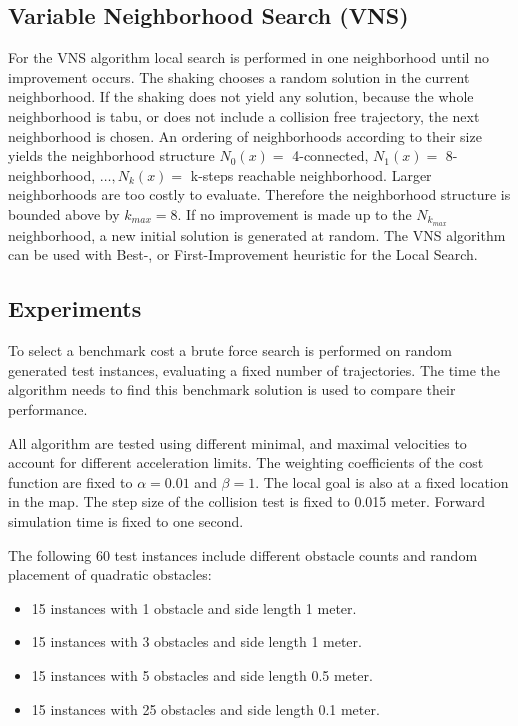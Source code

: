 \subsection{Variable Neighborhood Search (VNS)}
For the VNS algorithm local search is performed in one neighborhood until no improvement occurs. 
The shaking chooses a random solution in the current neighborhood. 
If the shaking does not yield any solution, because the whole neighborhood is tabu, or does not include a collision free trajectory, the next neighborhood is chosen. 
An ordering of neighborhoods according to their size yields the neighborhood structure $N_0(x)=$ 4-connected, $N_1(x)=$ 8-neighborhood, $\dots, N_k(x)=$ k-steps reachable neighborhood.
Larger neighborhoods are too costly to evaluate. 
Therefore the neighborhood structure is bounded above by $k_{max}=8$. 
If no improvement is made up to the $N_{k_{max}}$ neighborhood, a new initial solution is generated at random. 
The VNS algorithm can be used with Best-, or First-Improvement heuristic for the Local Search.

\subsection{Experiments}
To select a benchmark cost a brute force search is performed on random generated test instances, evaluating a fixed number of trajectories. 
The time the algorithm needs to find this benchmark solution is used to compare their performance.

All algorithm are tested using different minimal, and maximal velocities to account for different acceleration limits. 
The weighting coefficients of the cost function are fixed to $\alpha=0.01$ and $\beta=1$. The local goal is also at a fixed location in the map. 
The step size of the collision test is fixed to 0.015 meter. 
Forward simulation time is fixed to one second. 

The following 60 test instances include different obstacle counts and random placement of quadratic obstacles:
\begin{itemize}
\item 15 instances with 1 obstacle and side length 1 meter.
\item 15 instances with 3 obstacles and side length 1 meter.
\item 15 instances with 5 obstacles and side length 0.5 meter.
\item 15 instances with 25 obstacles and side length 0.1 meter.
\end{itemize}

